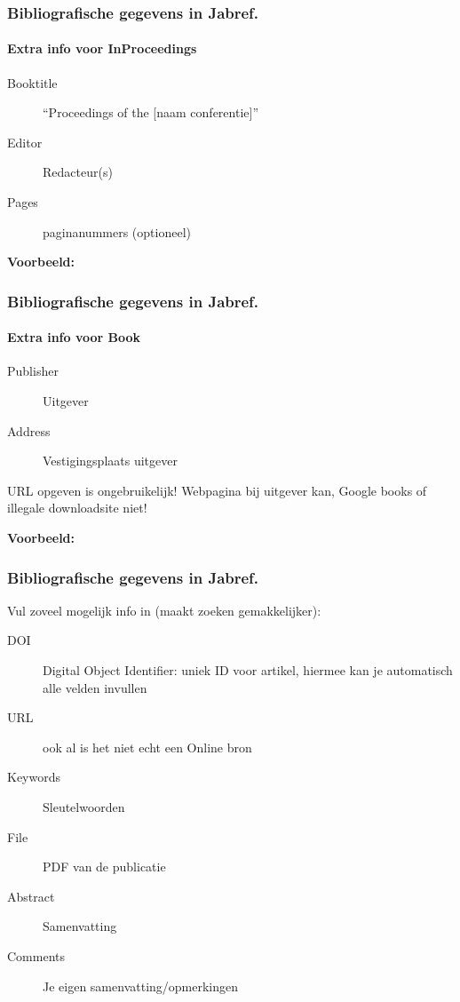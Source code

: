\documentclass[aspectratio=169]{beamer}
\begin{document}
\begin{frame}[plain]
  \frametitle{Bibliografische gegevens in Jabref.}
  \framesubtitle{Extra info voor InProceedings}

  \begin{description}
    \item[Booktitle] ``Proceedings of the [naam conferentie]''
    \item[Editor] Redacteur(s)
    \item[Pages] paginanummers (optioneel)
  \end{description}

  \medskip

  \textbf{Voorbeeld:}

\end{frame}

\begin{frame}
  \frametitle{Bibliografische gegevens in Jabref.}
  \framesubtitle{Extra info voor Book}

  \begin{description}
    \item[Publisher] Uitgever
    \item[Address] Vestigingsplaats uitgever
  \end{description}

  \medskip

  URL opgeven is ongebruikelijk! Webpagina bij uitgever kan, Google books of illegale downloadsite niet!

  \medskip

  \textbf{Voorbeeld:}

\end{frame}

\begin{frame}
  \frametitle{Bibliografische gegevens in Jabref.}

  Vul zoveel mogelijk info in (maakt zoeken gemakkelijker):

  \begin{description}
    \item[DOI] Digital Object Identifier: uniek ID voor artikel, hiermee kan je automatisch alle velden invullen
    \item[URL] ook al is het niet echt een Online bron
    \item[Keywords] Sleutelwoorden
    \item[File] PDF van de publicatie
    \item[Abstract] Samenvatting
    \item[Comments] Je eigen samenvatting/opmerkingen
  \end{description}

\end{frame}
\end{document}
